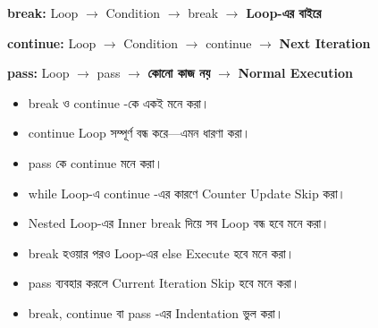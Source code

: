 

\begin{rememberbox}

\begin{center}

\textbf{\textenglish{\ttfamily break}:}
Loop
\(\longrightarrow\)
Condition
\(\longrightarrow\)
\textenglish{\ttfamily break}
\(\longrightarrow\)
\textbf{Loop-এর বাইরে}

\medskip

\textbf{\textenglish{\ttfamily continue}:}
Loop
\(\longrightarrow\)
Condition
\(\longrightarrow\)
\textenglish{\ttfamily continue}
\(\longrightarrow\)
\textbf{Next Iteration}

\medskip

\textbf{\textenglish{\ttfamily pass}:}
Loop
\(\longrightarrow\)
\textenglish{\ttfamily pass}
\(\longrightarrow\)
\textbf{কোনো কাজ নয়}
\(\longrightarrow\)
\textbf{Normal Execution}

\end{center}

\end{rememberbox}



\begin{rememberbox}

\begin{itemize}

\item
\textenglish{\ttfamily break}
ও
\textenglish{\ttfamily continue}
-কে একই মনে করা।

\item
\textenglish{\ttfamily continue}
Loop সম্পূর্ণ বন্ধ করে—এমন ধারণা করা।

\item
\textenglish{\ttfamily pass}
কে
\textenglish{\ttfamily continue}
মনে করা।

\item
\textenglish{\ttfamily while}
Loop-এ
\textenglish{\ttfamily continue}
-এর কারণে Counter Update Skip করা।

\item Nested Loop-এর Inner
\textenglish{\ttfamily break}
দিয়ে সব Loop বন্ধ হবে মনে করা।

\item
\textenglish{\ttfamily break}
হওয়ার পরও Loop-এর
\textenglish{\ttfamily else}
Execute হবে মনে করা।

\item
\textenglish{\ttfamily pass}
ব্যবহার করলে Current Iteration Skip হবে মনে করা।

\item
\textenglish{\ttfamily break},
\textenglish{\ttfamily continue}
বা
\textenglish{\ttfamily pass}
-এর Indentation ভুল করা।

\end{itemize}

\end{rememberbox}

